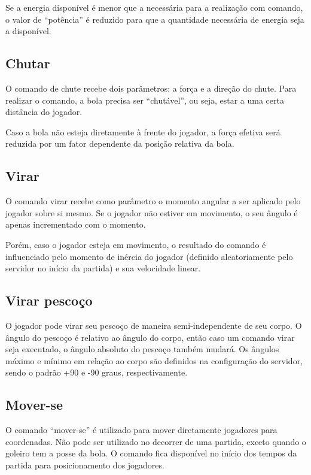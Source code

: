 Se a energia disponível é menor que a necessária para a realização com comando, o valor de ``potência'' é reduzido para que a quantidade necessária de energia seja a disponível.

\subsection{Chutar}

O comando de chute recebe dois parâmetros: a força e a direção do chute. Para realizar o comando, a bola precisa ser ``chutável'', ou seja, estar a uma certa distância do jogador.

Caso a bola não esteja diretamente à frente do jogador, a força efetiva será reduzida por um fator dependente da posição relativa da bola.

\subsection{Virar}

O comando virar recebe como parâmetro o momento angular a ser aplicado pelo jogador sobre si mesmo. Se o jogador não estiver em movimento, o seu ângulo é apenas incrementado com o momento.

Porém, caso o jogador esteja em movimento, o resultado do comando é influenciado pelo momento de inércia do jogador (definido aleatoriamente pelo servidor no início da partida) e sua velocidade linear.

\subsection{Virar pescoço}

O jogador pode virar seu pescoço de maneira semi-independente de seu corpo. O ângulo do pescoço é relativo ao ângulo do corpo, então caso um comando virar seja executado, o ângulo absoluto do pescoço também mudará. Os ângulos máximo e mínimo em relação ao corpo são definidos na configuração do servidor, sendo o padrão +90 e -90 graus, respectivamente.

\subsection{Mover-se}
\label{sec:move}

O comando ``mover-se'' é utilizado para mover diretamente jogadores para coordenadas. Não pode ser utilizado no decorrer de uma partida, exceto quando o goleiro tem a posse da bola. O comando fica disponível no início dos tempos da partida para posicionamento dos jogadores.

